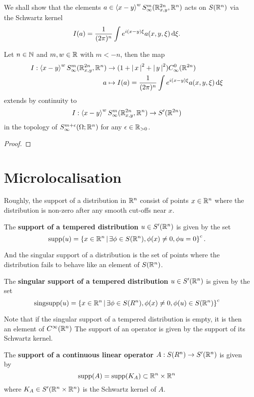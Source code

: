 \documentclass[12pt]{article}
\begin{document}
We shall show that the elements $a \in \sym[x - y]^w S^{m}_\infty(\R^{2n}_{x,y}, \R^n) $ acts on $S(\R^n)$ via the Schwartz kernel 
\[
I(a) =  \frac{1}{(2\pi)^n} \int e^{i(x - y)\xi} a(x, y, \xi) \d[\xi]. 
\]
\begin{fprop}
    Let $n \in \N$ and $m, w \in \R$ with $m < -n$, then the map
    \begin{align*}
    I: \sym[x - y]^w S^{m}_\infty(\R^{2n}_{x,y}, \R^n) &\to (1 + \abs{x}^2 + \abs{y}^2) C^0_\infty(\R^{2n}) \\
    a &\mapsto I(a) = \frac{1}{(2\pi)^n} \int e^{i(x - y)\xi} a(x, y, \xi) \d[\xi]
    \end{align*}
    extends by continuity to 
    \begin{align*}
    I: \sym[x - y]^w S^{m}_\infty(\R^{2n}_{x,y}, \R^n) \to S'(\R^{2n})
    \end{align*}
    in the topology of $S^{m + \epsilon}_\infty(\Omega; \R^n)$ for any $\epsilon \in \R_{>0}$. 
\end{fprop}
\begin{proof}
    
\end{proof}


\section{Microlocalisation}
Roughly, the support of a distribution in $\R^n$ consist of points $x \in \R^n$ where the distribution is non-zero after any smooth cut-offs near $x$. 
\begin{fdefinition}
    The \textbf{support of a tempered distribution} $u \in S'(\R^n)$ is given by the set
    \[
    \supp(u) = \set{x \in \R^n \wh \exists \phi \in S(\R^n), \phi(x) \neq 0, \phi u = 0}^c. 
    \]
\end{fdefinition}

And the singular support of a distribution is the set of points where the distribution fails to behave like an element of $S(\R^n)$. 
\begin{fdefinition}
    The \textbf{singular support of a tempered distribution} $ u \in S'(\R^n)$ is given by the set 
    \[
    \mathrm{sing supp}(u) = \set{x \in \R^n \wh \exists \phi \in S(R^n), \phi(x) \neq 0, \phi(u) \in S(\R^n)}^c
    \]
\end{fdefinition}
Note that if the singular support of a tempered distribution is empty, it is then an element of $C^\infty(\R^n)$ 
The support of an operator is given by the support of its Schwartz kernel. 
\begin{fdefinition}
    The \textbf{support of a continuous linear operator} $A: S(R^n) \to S'(\R^n)$ is given by 
    \[
    \supp(A) = \supp(K_A) \subset \R^n \times \R^n
    \]
    where $K_A \in S'(\R^n \times \R^n)$ is the Schwartz kernel of $A$. 
\end{fdefinition}
\end{document}
